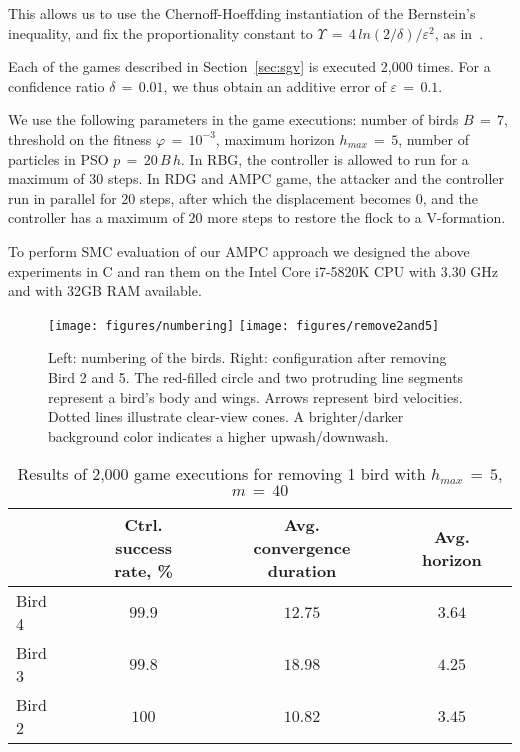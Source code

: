 This allows us to use the Chernoff-Hoeffding instantiation of the Bernstein's inequality, and fix the proportionality constant to $\Upsilon\,{=}\,4\,ln(2/\delta)/\varepsilon^2$, as in~\cite{HLMP04}. 

Each of the games described in Section~\ref{sec:sgv} is executed 2,000 times. For a confidence ratio $\delta\,{=}\,0.01$, we thus obtain an additive error of $\varepsilon\,{=}\, 0.1$.

We use the following parameters in the game executions: number of birds $B\,{=}\,7$, threshold on the fitness $\varphi\,{=}\,10^{-3}$, maximum horizon $h_{\mathit{max}}\,{=}\,5$, number of particles in PSO $p\,{=}\,20\,B\,h$. In RBG, the controller is allowed to run for a maximum of $30$ steps. In RDG and AMPC game, the attacker and the controller run in parallel for $20$ steps, after which the displacement becomes $0$, and the controller has a maximum of $20$ more steps to restore the flock to a V-formation.

To perform SMC evaluation of our AMPC approach we designed the above experiments in C and ran them on the Intel Core i7-5820K CPU with 3.30 GHz and with 32GB RAM available.\\

\begin{figure}[t]
 \vspace*{-3ex}
 \centering
  \texttt{[image: figures/numbering]}
  \texttt{[image: figures/remove2and5]}
  \vspace*{-5ex} 
  \caption{Left: numbering of the birds. Right: configuration after removing Bird 2 and 5. The red-filled circle and two protruding line segments represent a bird's body and wings. Arrows represent bird velocities. Dotted lines illustrate clear-view cones. A brighter/darker background color indicates a higher upwash/downwash.}
  \label{fig:numbering}
  \vspace{-3ex}
 \end{figure}

\begin{table}[h]
\centering
\vspace*{-4ex}
\caption {Results of 2,000 game executions for removing 1 bird with $h_{\mathit{max}}\,{=}\,5$,  $m\,{=}\,40$}
\vspace*{-1ex}
    \begin{tabular}{lcccccccccc}
    \toprule
		&&& Ctrl. success rate, \% &&& Avg. convergence duration &&& Avg. horizon\\ \midrule
    Bird 4  && & $99.9$           && & $12.75$  &&& $3.64$                            \\
    Bird 3  && & $99.8$           && & $18.98$  &&& $4.25$                            \\
    Bird 2  && & $100$           && & $10.82$  &&& $3.45$                            \\ \bottomrule
    \end{tabular}
\label{tab:resRemoveOne}
\end{table}

